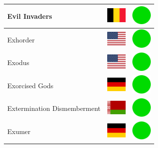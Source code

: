 \documentclass[12pt, a4paper, twoside]{report}
\begin{document}
\begin{center}
\begin{longtable}{|p{5cm}|p{2cm}|p{2cm}|}
 Evil Invaders                                              & \includegraphics[width=1cm]{4x3/be} &   \includegraphics[width=1cm]{likes/y} \\ \hline
 Exhorder                                                   & \includegraphics[width=1cm]{4x3/us} &   \includegraphics[width=1cm]{likes/y} \\ \hline
 Exodus                                                     & \includegraphics[width=1cm]{4x3/us} &   \includegraphics[width=1cm]{likes/y} \\ \hline
 Exorcised Gods                                             & \includegraphics[width=1cm]{4x3/de} &   \includegraphics[width=1cm]{likes/y} \\ \hline
 Extermination Dismemberment                                & \includegraphics[width=1cm]{4x3/by} &   \includegraphics[width=1cm]{likes/y} \\ \hline
 Exumer                                                     & \includegraphics[width=1cm]{4x3/de} &   \includegraphics[width=1cm]{likes/y} \\ \hline

\end{longtable}
\end{center}
\end{document}
